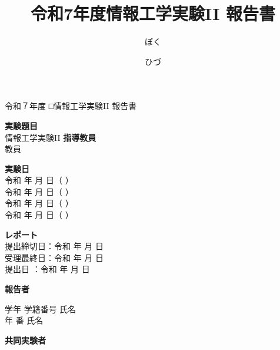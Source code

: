 \documentclass[a4paper,11pt]{jsarticle}
\title{令和7年度情報工学実験II 報告書}
\date{ひづ}
\author{ぼく}
\begin{document}
\begin{center}
\Large
令和７年度 □情報工学実験II 報告書
\end{center}

\vspace{10mm}

\begin{flushleft}
\textbf{実験題目} \\
情報工学実験II 
\textbf{指導教員} \\
教員
\end{flushleft}

\vspace{10mm}

\textbf{実験日} \\
令和  年  月  日（ ）\\
 令和  年  月  日（ ）\\
 令和  年  月  日（ ）\\
令和  年  月  日（ ）

\vspace{10mm}

\textbf{レポート} \\
提出締切日：令和  年  月  日 \\
受理最終日：令和  年  月  日 \\
提出日  ：令和  年  月  日

\vspace{10mm}

\textbf{報告者} \\
\begin{tabbing}
学年 \hspace{5em} 学籍番号 \hspace{5em} 氏名 \\
\underline{\hspace{4em}} 年 \underline{\hspace{4em}} 番 \underline{\hspace{10em}} 氏名
\end{tabbing}

\vspace{10mm}

\textbf{共同実験者} \\
\underline{\hspace{\textwidth}} \\
\underline{\hspace{\textwidth}} \\
\underline{\hspace{\textwidth}}
\end{document}
